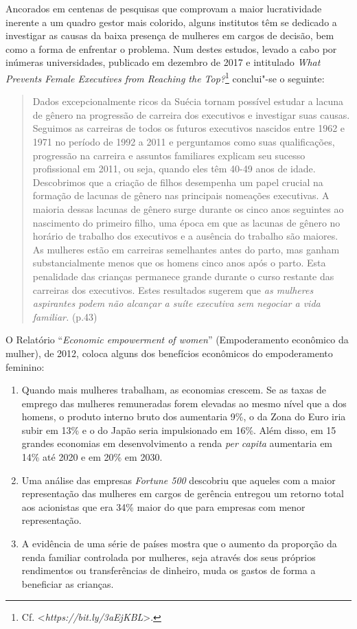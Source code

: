 Ancorados em centenas de pesquisas que comprovam a maior lucratividade
inerente a um quadro gestor mais colorido, alguns institutos têm se
dedicado a investigar as causas da baixa presença de mulheres em cargos
de decisão, bem como a forma de enfrentar o problema. Num destes
estudos, levado a cabo por inúmeras universidades, publicado em dezembro
de 2017 e intitulado \emph{What Prevents Female Executives from Reaching
the Top?}\footnote{Cf. \textless{}\emph{https://bit.ly/3aEjKBL}\textgreater{}.}
conclui"-se o seguinte:

\begin{quote}
Dados excepcionalmente ricos da Suécia tornam possível estudar a lacuna
de gênero na progressão de carreira dos executivos e investigar suas
causas. Seguimos as carreiras de todos os futuros executivos nascidos
entre 1962 e 1971 no período de 1992 a 2011 e perguntamos como suas
qualificações, progressão na carreira e assuntos familiares explicam seu
sucesso profissional em 2011, ou seja, quando eles têm 40-49 anos de
idade. Descobrimos que a criação de filhos desempenha um papel crucial
na formação de lacunas de gênero nas principais nomeações executivas. A
maioria dessas lacunas de gênero surge durante os cinco anos seguintes
ao nascimento do primeiro filho, uma época em que as lacunas de gênero
no horário de trabalho dos executivos e a ausência do trabalho são
maiores. As mulheres estão em carreiras semelhantes antes do parto, mas
ganham substancialmente menos que os homens cinco anos após o parto.
Esta penalidade das crianças permanece grande durante o curso restante
das carreiras dos executivos. Estes resultados sugerem que \emph{as
mulheres aspirantes podem não alcançar a suíte executiva sem negociar a
vida familiar.} (p.43)
\end{quote}

O Relatório ``\emph{Economic empowerment of women}'' (Empoderamento
econômico da mulher), de 2012, coloca alguns dos benefícios econômicos
do empoderamento feminino:

\begin{enumerate}
\def\labelenumi{\alph{enumi}.}

\item Quando mais mulheres trabalham, as economias crescem. Se as taxas de
emprego das mulheres remuneradas forem elevadas ao mesmo nível que a dos
homens, o produto interno bruto dos  aumentaria 9\%, o da Zona do
Euro iria subir em 13\% e o do Japão seria impulsionado em 16\%. Além
disso, em 15 grandes economias em desenvolvimento a renda \emph{per
capita} aumentaria em 14\% até 2020 e em 20\% em 2030.

\item Uma análise das empresas \emph{Fortune 500} descobriu que aqueles com
a maior representação das mulheres em cargos de gerência entregou um
retorno total aos acionistas que era 34\% maior do que para empresas com
menor representação.

\item A evidência de uma série de países mostra que o aumento da proporção
da renda familiar controlada por mulheres, seja através dos seus
próprios rendimentos ou transferências de dinheiro, muda os gastos de
forma a beneficiar as crianças.
\end{enumerate}

